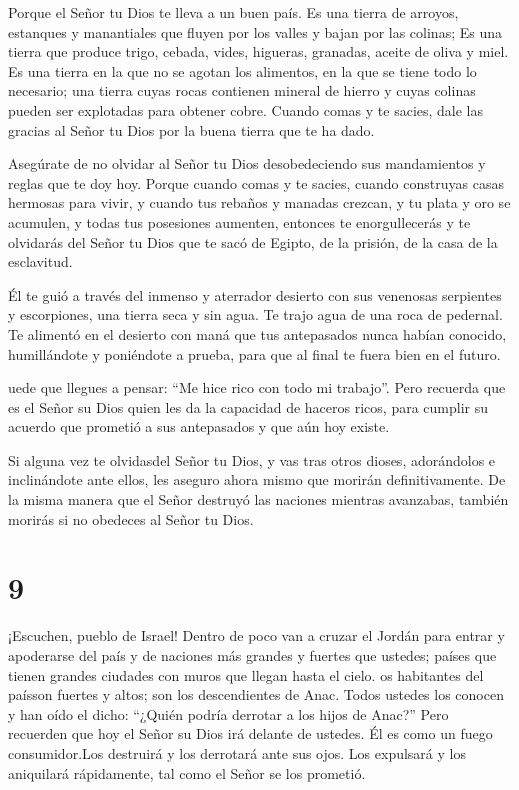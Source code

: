  Porque el Señor tu Dios te lleva a un buen país. Es una
tierra de arroyos, estanques y manantiales que fluyen por los valles y
bajan por las colinas;  Es una tierra que produce trigo,
cebada, vides, higueras, granadas, aceite de oliva y miel. 
Es una tierra en la que no se agotan los alimentos, en la que se tiene
todo lo necesario; una tierra cuyas rocas contienen mineral de hierro y
cuyas colinas pueden ser explotadas para obtener cobre. 
Cuando comas y te sacies, dale las gracias al Señor tu Dios por la buena
tierra que te ha dado.

 Asegúrate de no olvidar al Señor tu Dios desobedeciendo
sus mandamientos y reglas que te doy hoy.  Porque cuando
comas y te sacies, cuando construyas casas hermosas para vivir,
 y cuando tus rebaños y manadas crezcan, y tu plata y oro
se acumulen, y todas tus posesiones aumenten,  entonces te
enorgullecerás y te olvidarás del Señor tu Dios que te sacó de Egipto,
de la prisión, de la casa de la esclavitud.

 Él te guió a través del inmenso y aterrador desierto con
sus venenosas serpientes y escorpiones, una tierra seca y sin agua. Te
trajo agua de una roca de pedernal.  Te alimentó en el
desierto con maná que tus antepasados nunca habían conocido,
humillándote y poniéndote a prueba, para que al final te fuera bien en
el futuro.

 uede que llegues a pensar: ``Me hice rico con todo mi
trabajo''.  Pero recuerda que es el Señor su Dios quien les
da la capacidad de haceros ricos, para cumplir su acuerdo que prometió a
sus antepasados y que aún hoy existe.

 Si alguna vez te olvidasdel Señor tu Dios, y vas tras
otros dioses, adorándolos e inclinándote ante ellos, les aseguro ahora
mismo que morirán definitivamente.  De la misma manera que
el Señor destruyó las naciones mientras avanzabas, también morirás si no
obedeces al Señor tu Dios.

\hypertarget{section-8}{%
\section{9}\label{section-8}}

 ¡Escuchen, pueblo de Israel! Dentro de poco van a cruzar el
Jordán para entrar y apoderarse del país y de naciones más grandes y
fuertes que ustedes; países que tienen grandes ciudades con muros que
llegan hasta el cielo.  os habitantes del paísson fuertes y
altos; son los descendientes de Anac. Todos ustedes los conocen y han
oído el dicho: ``¿Quién podría derrotar a los hijos de Anac?''
 Pero recuerden que hoy el Señor su Dios irá delante de
ustedes. Él es como un fuego consumidor.Los destruirá y los derrotará
ante sus ojos. Los expulsará y los aniquilará rápidamente, tal como el
Señor se los prometió.

